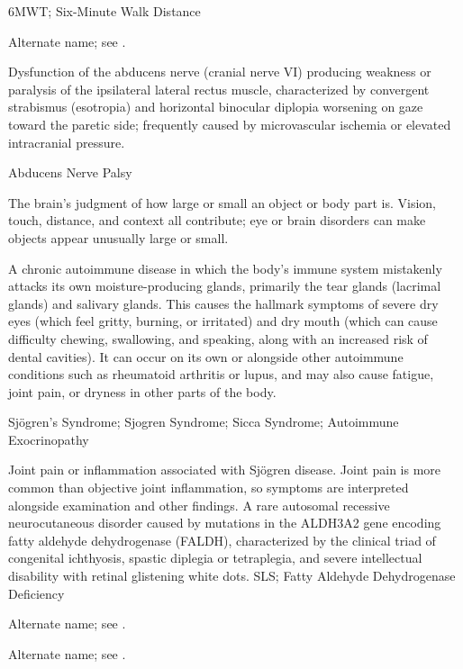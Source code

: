 \synonyms
6MWT; Six-Minute Walk Distance

 Alternate name; see .

 Dysfunction of the abducens nerve (cranial nerve VI) producing weakness or paralysis of the ipsilateral lateral rectus muscle, characterized by convergent strabismus (esotropia) and horizontal binocular diplopia worsening on gaze toward the paretic side; frequently caused by microvascular ischemia or elevated intracranial pressure.

\synonyms
Abducens Nerve Palsy

 The brain’s judgment of how large or small an object or body part is. Vision, touch, distance, and context all contribute; eye or brain disorders can make objects appear unusually large or small.

 A chronic autoimmune disease in which the body's immune system mistakenly attacks its own moisture-producing glands, primarily the tear glands (lacrimal glands) and salivary glands. This causes the hallmark symptoms of severe dry eyes (which feel gritty, burning, or irritated) and dry mouth (which can cause difficulty chewing, swallowing, and speaking, along with an increased risk of dental cavities). It can occur on its own or alongside other autoimmune conditions such as rheumatoid arthritis or lupus, and may also cause fatigue, joint pain, or dryness in other parts of the body.

\synonyms
Sjögren's Syndrome; Sjogren Syndrome; Sicca Syndrome; Autoimmune Exocrinopathy

 Joint pain or inflammation associated with Sjögren disease. Joint pain is more common than objective joint inflammation, so symptoms are interpreted alongside examination and other findings.
 A rare autosomal recessive neurocutaneous disorder caused by mutations in the ALDH3A2 gene encoding fatty aldehyde dehydrogenase (FALDH), characterized by the clinical triad of congenital ichthyosis, spastic diplegia or tetraplegia, and severe intellectual disability with retinal glistening white dots.
\synonyms
SLS; Fatty Aldehyde Dehydrogenase Deficiency

 Alternate name; see .

 Alternate name; see .

